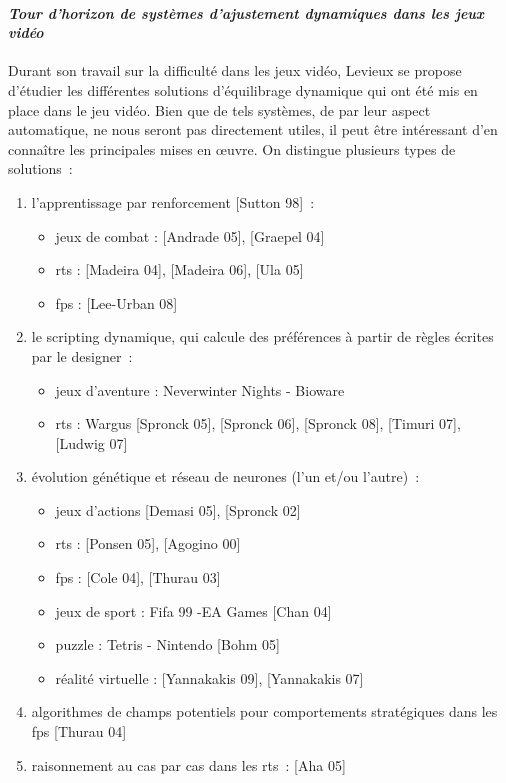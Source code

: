 	\paragraph{\emph{Tour d'horizon de systèmes d'ajustement dynamiques dans les jeux vidéo}	 \\ \quad}
Durant son travail sur la difficulté dans les jeux vidéo, Levieux se propose d'étudier les différentes solutions d’équilibrage dynamique qui ont été mis en place dans le jeu vidéo. Bien que de tels systèmes, de par leur aspect automatique, ne nous seront pas directement utiles, il peut être intéressant d'en connaître les principales mises en œuvre. On distingue plusieurs types de solutions~: 
\begin{enumerate}
	\item l’apprentissage par renforcement [Sutton 98]~:
	\begin{itemize}
		\item jeux de combat : [Andrade 05], [Graepel 04]
		\item \gls{rts} : [Madeira 04], [Madeira 06], [Ula 05]
		\item \gls{fps} : [Lee-Urban 08]
	\end{itemize}
	\item le scripting dynamique, qui calcule des préférences à partir de règles écrites par le designer~:
	\begin{itemize}
		\item jeux d’aventure : Neverwinter Nights - Bioware
		\item \gls{rts} : Wargus [Spronck 05], [Spronck 06], [Spronck 08], [Timuri 07], [Ludwig 07]
	\end{itemize}
		\item évolution génétique et réseau de neurones (l’un et/ou l’autre)~:
	\begin{itemize}
		\item jeux d’actions [Demasi 05], [Spronck 02]
		\item \gls{rts} : [Ponsen 05], [Agogino 00]
		\item \gls{fps} : [Cole 04], [Thurau 03]
		\item jeux de sport : Fifa 99 -EA Games [Chan 04]
		\item puzzle : Tetris - Nintendo [Bohm 05]
		\item réalité virtuelle : [Yannakakis 09], [Yannakakis 07]
	\end{itemize}
		\item algorithmes de champs potentiels pour comportements stratégiques dans les \gls{fps} [Thurau 04]
		\item raisonnement au cas par cas dans les \gls{rts}~: [Aha 05]
\end{enumerate}

